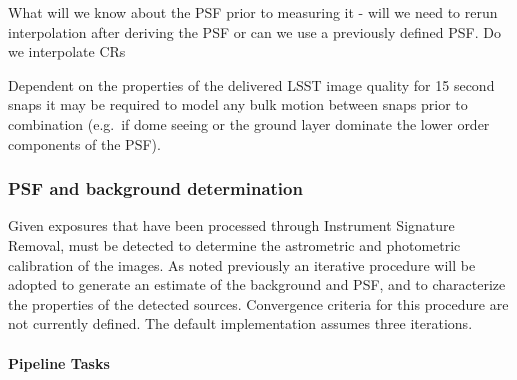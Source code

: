 \begin{note} What will we know about the PSF prior to measuring it - will we need to rerun interpolation after deriving the PSF or can we use a previously defined PSF. Do we interpolate CRs \end{note}

Dependent on the properties of the delivered LSST image quality for 15 second snaps it may be required to model any bulk motion between snaps prior to combination (e.g.\ if dome seeing or the ground layer dominate the lower order components of the PSF).


\subsubsection{PSF and background determination}
\label{sec:apPSFBackground}

Given exposures that have been processed through Instrument Signature Removal, \Sources must be detected to determine the astrometric and photometric calibration of the images. As noted previously an iterative procedure will be adopted to generate an estimate of the background and PSF, and to characterize the properties of the detected sources.  Convergence criteria for this procedure are not currently defined. The default implementation assumes three iterations.

\paragraph{Pipeline Tasks}~

